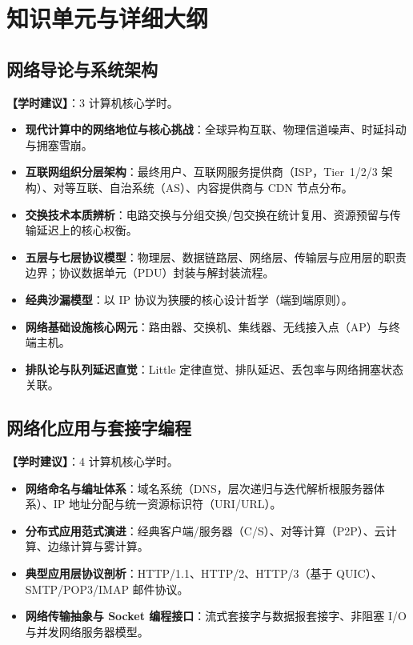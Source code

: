 \section{知识单元与详细大纲}

\subsection{网络导论与系统架构}
\textbf{【学时建议】}：3 计算机核心学时。

\begin{itemize}
    \item \textbf{现代计算中的网络地位与核心挑战}：全球异构互联、物理信道噪声、时延抖动与拥塞雪崩。
    \item \textbf{互联网组织分层架构}：最终用户、互联网服务提供商（ISP，Tier~1/2/3 架构）、对等互联、自治系统（AS）、内容提供商与 CDN 节点分布。
    \item \textbf{交换技术本质辨析}：电路交换与分组交换/包交换在统计复用、资源预留与传输延迟上的核心权衡。
    \item \textbf{五层与七层协议模型}：物理层、数据链路层、网络层、传输层与应用层的职责边界；协议数据单元（PDU）封装与解封装流程。
    \item \textbf{经典沙漏模型}：以 IP 协议为狭腰的核心设计哲学（端到端原则）。
    \item \textbf{网络基础设施核心网元}：路由器、交换机、集线器、无线接入点（AP）与终端主机。
    \item \textbf{排队论与队列延迟直觉}：Little 定律直觉、排队延迟、丢包率与网络拥塞状态关联。
\end{itemize}

\subsection{网络化应用与套接字编程}
\textbf{【学时建议】}：4 计算机核心学时。

\begin{itemize}
    \item \textbf{网络命名与编址体系}：域名系统（DNS，层次递归与迭代解析根服务器体系）、IP 地址分配与统一资源标识符（URI/URL）。
    \item \textbf{分布式应用范式演进}：经典客户端/服务器（C/S）、对等计算（P2P）、云计算、边缘计算与雾计算。
    \item \textbf{典型应用层协议剖析}：HTTP/1.1、HTTP/2、HTTP/3（基于 QUIC）、SMTP/POP3/IMAP 邮件协议。
    \item \textbf{网络传输抽象与 Socket 编程接口}：流式套接字与数据报套接字、非阻塞 I/O 与并发网络服务器模型。
\end{itemize}

